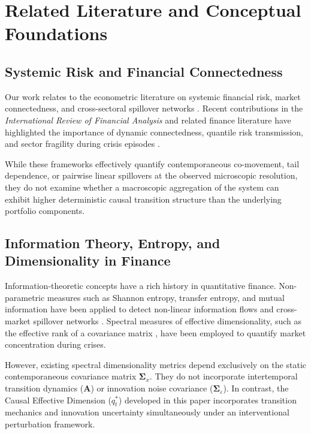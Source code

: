 \documentclass[review,12pt,authoryear]{elsarticle}
\begin{document}
\section{Related Literature and Conceptual Foundations}
\label{sec:literature}

\subsection{Systemic Risk and Financial Connectedness}
Our work relates to the econometric literature on systemic financial risk, market connectedness, and cross-sectoral spillover networks \citep{billio2012econometric, diebold2012better, diebold2014network, adrian2016covar, brownlees2017srisk}. Recent contributions in the \emph{International Review of Financial Analysis} and related finance literature have highlighted the importance of dynamic connectedness, quantile risk transmission, and sector fragility during crisis episodes \citep{ahelegbey2022network, yousaf2022linkages, mensi2021spillovers, bouri2021return, yang2023modeling}. 

While these frameworks effectively quantify contemporaneous co-movement, tail dependence, or pairwise linear spillovers at the observed microscopic resolution, they do not examine whether a macroscopic aggregation of the system can exhibit higher deterministic causal transition structure than the underlying portfolio components.

\subsection{Information Theory, Entropy, and Dimensionality in Finance}
Information-theoretic concepts have a rich history in quantitative finance. Non-parametric measures such as Shannon entropy, transfer entropy, and mutual information have been applied to detect non-linear information flows and cross-market spillover networks \citep{schreiber2000measuring, dimpfl2013using, bekiros2017information}. Spectral measures of effective dimensionality, such as the effective rank of a covariance matrix \citep{roy2007effective}, have been employed to quantify market concentration during crises.

However, existing spectral dimensionality metrics depend exclusively on the static contemporaneous covariance matrix $\boldsymbol{\Sigma}_x$. They do not incorporate intertemporal transition dynamics ($\mathbf{A}$) or innovation noise covariance ($\boldsymbol{\Sigma}_\varepsilon$). In contrast, the Causal Effective Dimension ($q_t^*$) developed in this paper incorporates transition mechanics and innovation uncertainty simultaneously under an interventional perturbation framework.
\end{document}
